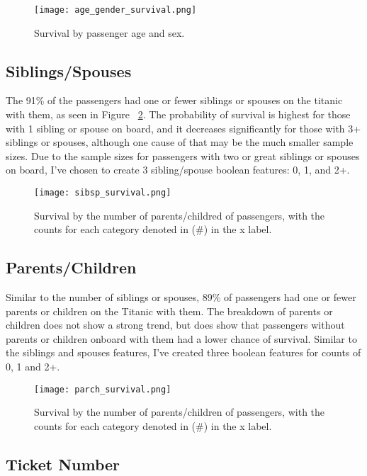 \documentclass[12pt, letterpaper]{article}
\begin{document}
\begin{figure}[H]
    \centering
    \texttt{[image: age\_gender\_survival.png]}
    \caption{Survival by passenger age and sex.}
    \label{fig:age_gender_prob}
\end{figure}


\subsection{Siblings/Spouses}

The 91\% of the passengers had one or fewer siblings or spouses on the titanic with them, as seen in Figure ~\ref{fig:sibsp_prob}. The probability of survival is highest for those with 1 sibling or spouse on board, and it decreases significantly for those with 3+ siblings or spouses, although one cause of that may be the much smaller sample sizes. Due to the sample sizes for passengers with two or great siblings or spouses on board, I've chosen to create 3 sibling/spouse boolean features: 0, 1, and 2+.

\begin{figure}[H]
    \centering
    \texttt{[image: sibsp\_survival.png]}
    \caption{Survival by the number of parents/childred of passengers, with the counts for each category denoted in (\#) in the x label. }
    \label{fig:sibsp_prob}
\end{figure}


\subsection{Parents/Children}

Similar to the number of siblings or spouses, 89\% of passengers had one or fewer parents or children on the Titanic with them. The breakdown of parents or children does not show a strong trend, but does show that passengers without parents or children onboard with them had a lower chance of survival. Similar to the siblings and spouses features, I've created three boolean features for counts of 0, 1 and 2+.

\begin{figure}[H]
    \centering
    \texttt{[image: parch\_survival.png]}
    \caption{Survival by the number of parents/children of passengers, with the counts for each category denoted in (\#) in the x label. }
    \label{fig:parch_prob}
\end{figure}


\subsection{Ticket Number}
\end{document}
